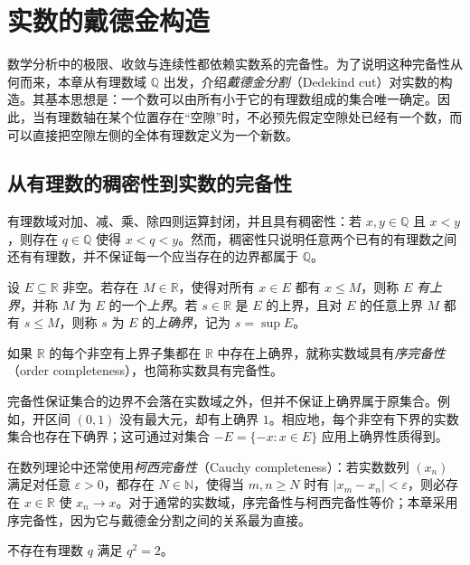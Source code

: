 \documentclass[UTF8,12pt,a4paper,fontset=fandol]{ctexbook}
\begin{document}
\chapter{实数的戴德金构造}

数学分析中的极限、收敛与连续性都依赖实数系的完备性。为了说明这种完备性从何而来，本章从有理数域 $\mathbb{Q}$ 出发，介绍\emph{戴德金分割}（Dedekind cut）对实数的构造。其基本思想是：一个数可以由所有小于它的有理数组成的集合唯一确定。因此，当有理数轴在某个位置存在“空隙”时，不必预先假定空隙处已经有一个数，而可以直接把空隙左侧的全体有理数定义为一个新数。

\section{从有理数的稠密性到实数的完备性}

有理数域对加、减、乘、除四则运算封闭，并且具有稠密性：若 $x,y\in\mathbb{Q}$ 且 $x<y$，则存在 $q\in\mathbb{Q}$ 使得 $x<q<y$。然而，稠密性只说明任意两个已有的有理数之间还有有理数，并不保证每一个应当存在的边界都属于 $\mathbb{Q}$。

\begin{definition}[实数的序完备性]\label{def:order-completeness}
设 $E\subseteq\mathbb{R}$ 非空。若存在 $M\in\mathbb{R}$，使得对所有 $x\in E$ 都有 $x\le M$，则称 $E$ \emph{有上界}，并称 $M$ 为 $E$ 的一个\emph{上界}。若 $s\in\mathbb{R}$ 是 $E$ 的上界，且对 $E$ 的任意上界 $M$ 都有 $s\le M$，则称 $s$ 为 $E$ 的\emph{上确界}，记为 $s=\sup E$。

如果 $\mathbb{R}$ 的每个非空有上界子集都在 $\mathbb{R}$ 中存在上确界，就称实数域具有\emph{序完备性}（order completeness），也简称实数具有完备性。
\end{definition}

完备性保证集合的边界不会落在实数域之外，但并不保证上确界属于原集合。例如，开区间 $(0,1)$ 没有最大元，却有上确界 $1$。相应地，每个非空有下界的实数集合也存在下确界；这可通过对集合 $-E=\{-x:x\in E\}$ 应用上确界性质得到。

在数列理论中还常使用\emph{柯西完备性}（Cauchy completeness）：若实数数列 $(x_n)$ 满足对任意 $\varepsilon>0$，都存在 $N\in\mathbb{N}$，使得当 $m,n\ge N$ 时有 $|x_m-x_n|<\varepsilon$，则必存在 $x\in\mathbb{R}$ 使 $x_n\to x$。对于通常的实数域，序完备性与柯西完备性等价；本章采用序完备性，因为它与戴德金分割之间的关系最为直接。

\begin{proposition}
不存在有理数 $q$ 满足 $q^2=2$。
\end{proposition}
\end{document}

